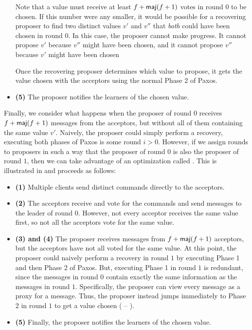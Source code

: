 \begin{itemize}
    Note that a value must receive at least $f + \textsf{maj}(f+1)$ votes in round $0$
    to be chosen. If this number were any smaller, it would be possible for a
    recovering proposer to find two distinct values $v'$ and $v''$ that
    \emph{both} could have been chosen in round $0$. In this case, the proposer
    cannot make progress. It cannot propose $v'$ because $v''$ might have been
    chosen, and it cannot propose $v''$ because $v'$ might have been chosen

    Once the recovering proposer determines which value to propose, it gets the
    value chosen with the acceptors using the normal Phase 2 of Paxos.

  \item \textbf{(5)}
    The proposer notifies the learners of the chosen value.
\end{itemize}

Finally, we consider what happens when the proposer of round $0$ receives $f +
\textsf{maj}(f+1)$  messages from the acceptors, but without all of
them containing the same value $v'$. Naively, the proposer could simply
perform a recovery, executing both phases of Paxos is some round $i > 0$.
However, if we assign rounds to proposers in such a way that the proposer of
round $0$ is also the proposer of round $1$, then we can take advantage of an
optimization called . This is illustrated in
 and proceeds as follows:

\begin{itemize}
  \item \textbf{(1)}
    Multiple clients send distinct commands directly to the acceptors.

  \item \textbf{(2)}
    The acceptors receive and vote for the commands and send 
    messages to the leader of round $0$. However, not every acceptor receives
    the same value first, so not all the acceptors vote for the same value.

  \item \textbf{(3) and (4)}
    The proposer receives  messages from $f+\textsf{maj}(f+1)$
    acceptors, but the acceptors have not all voted for the same value. At this
    point, the proposer could naively perform a recovery in round $1$ by
    executing Phase 1 and then Phase 2 of Paxos. But, executing Phase 1 in
    round $1$ is redundant, since the  messages in round $0$
    contain exactly the same information as the  messages in
    round $1$. Specifically, the proposer can view every 
    message as a proxy for a  message. Thus, the proposer
    instead jumps immediately to Phase 2 in round $1$ to get a value chosen
    ( -- ).

  \item \textbf{(5)}
    Finally, the proposer notifies the learners of the chosen value.
\end{itemize}
